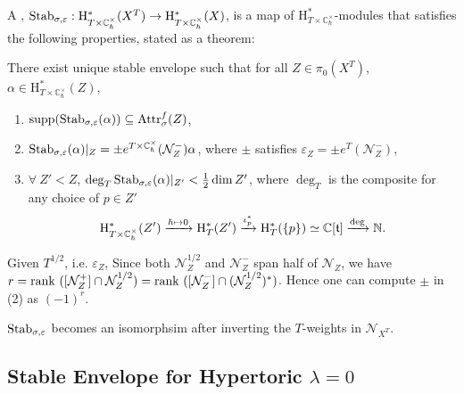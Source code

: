 \documentclass[b5paper]{article}
\newcommand{\mathintitle}[1]{\texorpdfstring{$#1$}{\detokenize{#1}}}
\newcommand{\NN}{\mathcal{N}}
\newcommand{\HH}{\mathrm{H}}
\newcommand{\supp}{\mathrm{supp}}
\newcommand{\Stab}{\textnormal{Stab}_{\sigma,\varepsilon}}
\newcommand{\fAttr}{\textnormal{Attr}^f_\sigma}
\newcommand{\Chbar}{\mathbb{C}^\times _\hbar}
\begin{document}
A , $\Stab:\HH^*_{T\times \Chbar}(X^T)\rightarrow \HH^*_{T\times \Chbar}(X)$, is a map of $\HH^*_{T\times \Chbar}$-modules that satisfies the following properties, stated as a theorem:

\begin{theorem}{}
    There exist unique stable envelope such that for all $Z\in \pi_0(X^T)$, $\alpha\in \HH^*_{T\times \Chbar}(Z)$,
    \begin{enumerate}
        \item $\supp(\Stab(\alpha))\subseteq \fAttr(Z)$,
        \item $\Stab(\alpha)|_Z=\pm e^{T\times \Chbar}(\NN_Z^-)\alpha$, where $\pm$ satisfies $\varepsilon_Z=\pm e^T(\NN_Z^-)$,
        \item $\forall\ Z'<Z$, $\deg_T\Stab(\alpha)|_{Z'}<\frac{1}{2}\dim Z'$, where $\deg_T$ is the composite for any choice of $p\in Z'$
            \[
                \HH^*_{T\times \Chbar}(Z')\xrightarrow[]{\hbar\mapsto 0}\HH^*_T(Z')\xrightarrow[]{\iota^*_p}\HH^*_T(\CB{p})\simeq \mathbb{C}[\mathfrak{t}]\xrightarrow[]{\deg}\mathbb{N}.
            \]
    \end{enumerate}
    \begin{remark}
    Given $T^{1/2}$, i.e. $\varepsilon_Z$, Since both $\NN_Z^{1/2}$ and $\NN_Z^-$ span half of $\NN_Z$, we have $r=\rank([\NN_Z^+]\cap \NN_Z^{1/2})=\rank([\NN_Z^-]\cap (\NN_Z^{1/2})^*)$. Hence one can compute $\pm$ in (2) as $(-1)^r$.
    \end{remark}
\end{theorem}

\begin{theorem}[thm:]{}
    $\Stab$ becomes an isomorphsim after inverting the $T$-weights in $\NN_{X^T}$.
\end{theorem}

\subsection{Stable Envelope for Hypertoric \mathintitle{\lambda=0}}
\end{document}
